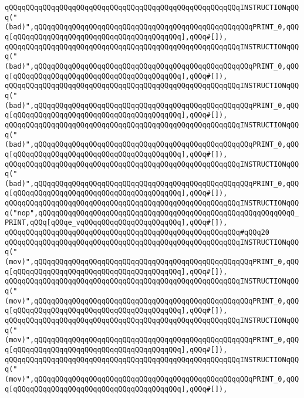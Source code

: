 \verb|qQQqqQQqqQQqqQQqqQQqqQQqqQQqqQQqqQQqqQQqqQQqqQQqqQQqqQQqINSTRUCTIONqQQq("(bad)",qQQqqQQqqQQqqQQqqQQqqQQqqQQqqQQqqQQqqQQqqQQqqQQqqQQqPRINT_0,qQQq[qQQqqQQqqQQqqQQqqQQqqQQqqQQqqQQqqQQqqQQq],qQQq#[]),|\newline
\verb|qQQqqQQqqQQqqQQqqQQqqQQqqQQqqQQqqQQqqQQqqQQqqQQqqQQqqQQqINSTRUCTIONqQQq("(bad)",qQQqqQQqqQQqqQQqqQQqqQQqqQQqqQQqqQQqqQQqqQQqqQQqqQQqPRINT_0,qQQq[qQQqqQQqqQQqqQQqqQQqqQQqqQQqqQQqqQQqqQQq],qQQq#[]),|\newline
\verb|qQQqqQQqqQQqqQQqqQQqqQQqqQQqqQQqqQQqqQQqqQQqqQQqqQQqqQQqINSTRUCTIONqQQq("(bad)",qQQqqQQqqQQqqQQqqQQqqQQqqQQqqQQqqQQqqQQqqQQqqQQqqQQqPRINT_0,qQQq[qQQqqQQqqQQqqQQqqQQqqQQqqQQqqQQqqQQqqQQq],qQQq#[]),|\newline
\verb|qQQqqQQqqQQqqQQqqQQqqQQqqQQqqQQqqQQqqQQqqQQqqQQqqQQqqQQqINSTRUCTIONqQQq("(bad)",qQQqqQQqqQQqqQQqqQQqqQQqqQQqqQQqqQQqqQQqqQQqqQQqqQQqPRINT_0,qQQq[qQQqqQQqqQQqqQQqqQQqqQQqqQQqqQQqqQQqqQQq],qQQq#[]),|\newline
\verb|qQQqqQQqqQQqqQQqqQQqqQQqqQQqqQQqqQQqqQQqqQQqqQQqqQQqqQQqINSTRUCTIONqQQq("(bad)",qQQqqQQqqQQqqQQqqQQqqQQqqQQqqQQqqQQqqQQqqQQqqQQqqQQqPRINT_0,qQQq[qQQqqQQqqQQqqQQqqQQqqQQqqQQqqQQqqQQqqQQq],qQQq#[]),|\newline
\verb|qQQqqQQqqQQqqQQqqQQqqQQqqQQqqQQqqQQqqQQqqQQqqQQqqQQqqQQqINSTRUCTIONqQQq("nop",qQQqqQQqqQQqqQQqqQQqqQQqqQQqqQQqqQQqqQQqqQQqqQQqqQQqqQQqqQQqQ_PRINT,qQQq[qQQqe_vqQQqqQQqqQQqqQQqqQQqqQQq],qQQq#[]),|\newline
\verb|qQQqqQQqqQQqqQQqqQQqqQQqqQQqqQQqqQQqqQQqqQQqqQQqqQQqqQQq#qQQq20|\newline
\verb|qQQqqQQqqQQqqQQqqQQqqQQqqQQqqQQqqQQqqQQqqQQqqQQqqQQqqQQqINSTRUCTIONqQQq("(mov)",qQQqqQQqqQQqqQQqqQQqqQQqqQQqqQQqqQQqqQQqqQQqqQQqqQQqPRINT_0,qQQq[qQQqqQQqqQQqqQQqqQQqqQQqqQQqqQQqqQQqqQQq],qQQq#[]),|\newline
\verb|qQQqqQQqqQQqqQQqqQQqqQQqqQQqqQQqqQQqqQQqqQQqqQQqqQQqqQQqINSTRUCTIONqQQq("(mov)",qQQqqQQqqQQqqQQqqQQqqQQqqQQqqQQqqQQqqQQqqQQqqQQqqQQqPRINT_0,qQQq[qQQqqQQqqQQqqQQqqQQqqQQqqQQqqQQqqQQqqQQq],qQQq#[]),|\newline
\verb|qQQqqQQqqQQqqQQqqQQqqQQqqQQqqQQqqQQqqQQqqQQqqQQqqQQqqQQqINSTRUCTIONqQQq("(mov)",qQQqqQQqqQQqqQQqqQQqqQQqqQQqqQQqqQQqqQQqqQQqqQQqqQQqPRINT_0,qQQq[qQQqqQQqqQQqqQQqqQQqqQQqqQQqqQQqqQQqqQQq],qQQq#[]),|\newline
\verb|qQQqqQQqqQQqqQQqqQQqqQQqqQQqqQQqqQQqqQQqqQQqqQQqqQQqqQQqINSTRUCTIONqQQq("(mov)",qQQqqQQqqQQqqQQqqQQqqQQqqQQqqQQqqQQqqQQqqQQqqQQqqQQqPRINT_0,qQQq[qQQqqQQqqQQqqQQqqQQqqQQqqQQqqQQqqQQqqQQq],qQQq#[]),|\newline

